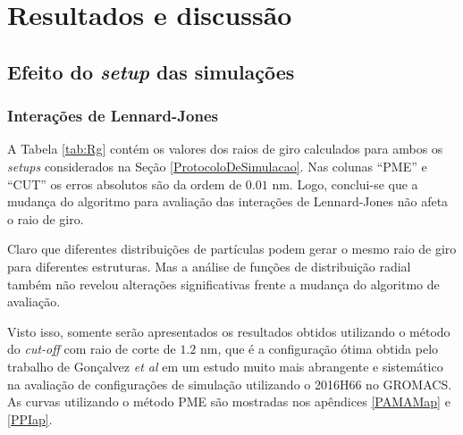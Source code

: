 \chapter{Resultados e discussão}\label{Resultados}

\section{Efeito do \textit{setup} das simulações}\label{EfeitoDoSetup}

\subsection{Interações de Lennard-Jones}

A Tabela \ref{tab:Rg} contém os valores dos raios de giro calculados para ambos os \textit{setups} considerados na Seção \ref{ProtocoloDeSimulacao}. 
Nas colunas ``PME'' e ``CUT'' os erros absolutos são da ordem de $0.01$ nm. 
Logo, conclui-se que a mudança do algoritmo para avaliação das interações de Lennard-Jones não afeta o raio de giro.

Claro que diferentes distribuições de partículas podem gerar o mesmo raio de giro para diferentes estruturas.
Mas a análise de funções de distribuição radial também não revelou alterações significativas frente a mudança do algoritmo de avaliação.

Visto isso, somente serão apresentados os resultados obtidos utilizando o método do \textit{cut-off} com raio de corte de $1.2$ nm, que é a configuração ótima obtida pelo trabalho de Gonçalvez \textit{et al}\cite{Goncalvez2018} em um estudo muito mais abrangente e sistemático na avaliação de configurações de simulação utilizando o 2016H66\cite{Horta2016} no GROMACS\cite{VanDerSpoel2005}.
As curvas utilizando o método PME são mostradas nos apêndices \ref{PAMAMap} e \ref{PPIap}.

